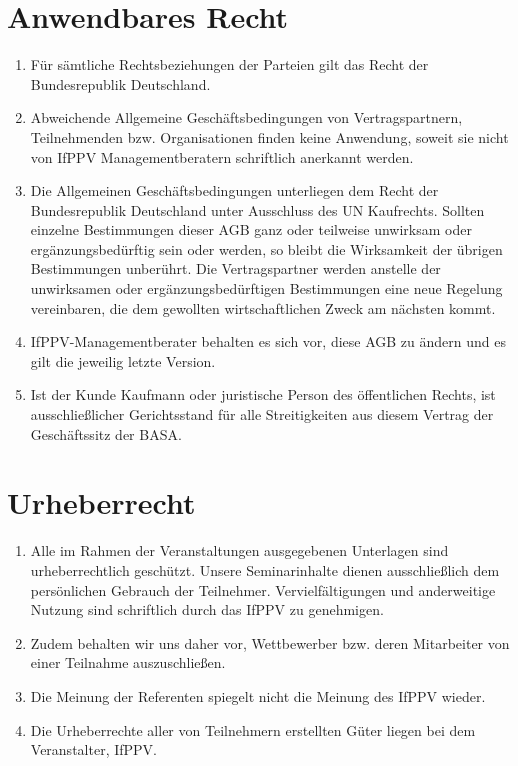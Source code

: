\documentclass[a4paper, 12pt]{scrartcl}
\begin{document}
    \section{Anwendbares Recht}
    \begin{enumerate}
        \item F\"ur s\"amtliche Rechtsbeziehungen der Parteien gilt das Recht der Bundesrepublik Deutschland.

        \item Abweichende Allgemeine Gesch\"aftsbedingungen von Vertragspartnern, Teilnehmenden bzw. Organisationen finden keine Anwendung, soweit sie nicht von IfPPV Managementberatern schriftlich anerkannt werden.

        \item Die Allgemeinen Gesch\"aftsbedingungen unterliegen dem Recht der Bundesrepublik Deutschland unter Ausschluss des UN Kaufrechts.
        Sollten einzelne Bestimmungen dieser AGB ganz oder teilweise unwirksam oder erg\"anzungsbed\"urftig sein oder werden, so bleibt die Wirksamkeit der \"ubrigen Bestimmungen unber\"uhrt.
        Die Vertragspartner werden anstelle der unwirksamen oder erg\"anzungsbed\"urftigen Bestimmungen eine neue Regelung vereinbaren, die dem gewollten wirtschaftlichen Zweck am n\"achsten kommt.

        \item IfPPV-Managementberater behalten es sich vor, diese AGB zu \"andern und es gilt die jeweilig letzte Version.

        \item Ist der Kunde Kaufmann oder juristische Person des \"offentlichen Rechts, ist ausschließlicher Gerichtsstand f\"ur alle Streitigkeiten aus diesem Vertrag der Gesch\"aftssitz der BASA.
    \end{enumerate}

    \section{Urheberrecht}
    \begin{enumerate}
        \item Alle im Rahmen der Veranstaltungen ausgegebenen Unterlagen sind urheberrechtlich geschützt.
        Unsere Seminarinhalte dienen ausschließlich dem persönlichen Gebrauch der Teilnehmer.
        Vervielfältigungen und anderweitige Nutzung sind schriftlich durch das IfPPV zu genehmigen.
        
        \item Zudem behalten wir uns daher vor, Wettbewerber bzw. deren Mitarbeiter von einer Teilnahme auszuschließen.
        
        \item Die Meinung der Referenten spiegelt nicht die Meinung des IfPPV wieder.
        
        \item Die Urheberrechte aller von Teilnehmern erstellten G\"uter liegen bei dem Veranstalter, IfPPV.
    \end{enumerate}
\end{document}
